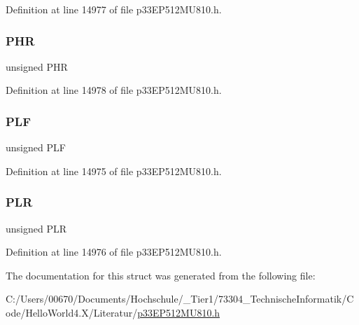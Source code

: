 Definition at line 14977 of file p33\+E\+P512\+M\+U810.\+h.

\mbox{\label{structtag_l_e_b_c_o_n4_b_i_t_s_ae02a9c6926c3a1feac21cec18a520e4a}} 
\subsubsection{\texorpdfstring{P\+HR}{PHR}}
{\footnotesize\ttfamily unsigned P\+HR}



Definition at line 14978 of file p33\+E\+P512\+M\+U810.\+h.

\mbox{\label{structtag_l_e_b_c_o_n4_b_i_t_s_ab72be8b35e01107182afb8e9733d72bb}} 
\subsubsection{\texorpdfstring{P\+LF}{PLF}}
{\footnotesize\ttfamily unsigned P\+LF}



Definition at line 14975 of file p33\+E\+P512\+M\+U810.\+h.

\mbox{\label{structtag_l_e_b_c_o_n4_b_i_t_s_a5f690459b53fc81b46dbbac226cecb25}} 
\subsubsection{\texorpdfstring{P\+LR}{PLR}}
{\footnotesize\ttfamily unsigned P\+LR}



Definition at line 14976 of file p33\+E\+P512\+M\+U810.\+h.



The documentation for this struct was generated from the following file\+:\begin{DoxyCompactItemize}
\item 
C\+:/\+Users/00670/\+Documents/\+Hochschule/\+\_\+\+Tier1/73304\+\_\+\+Technische\+Informatik/\+Code/\+Hello\+World4.\+X/\+Literatur/\hyperlink{p33_e_p512_m_u810_8h}{p33\+E\+P512\+M\+U810.\+h}\end{DoxyCompactItemize}
